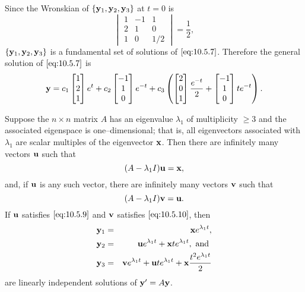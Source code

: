 \documentclass{ximera}
\begin{document}
\begin{example}
\begin{explanation}
Since the Wronskian of $\{{\bf y}_1,{\bf y}_2,{\bf y}_3\}$
at $t=0$ is
$$
\begin{vmatrix}
1&-1&1\\2&1&0\\1&0&1/2\end{vmatrix}=\frac{1}{2},
$$
$\{{\bf y}_1,{\bf y}_2,{\bf y}_3\}$ is a fundamental set of solutions
of $\eqref{eq:10.5.7}$. Therefore the general solution of $\eqref{eq:10.5.7}$
is
$$
{\bf y}=c_1\begin{bmatrix}1\\2\\1\end{bmatrix}e^t+c_2\begin{bmatrix}-1\\1\\0\end{bmatrix}e^{-t}+c_3\left
(\begin{bmatrix}2\\0\\1\end{bmatrix}\frac{e^{-t}}{2}+\begin{bmatrix}-1\\1\\0\end{bmatrix}te^{-t}\right).
$$
\end{explanation}
\end{example}


\begin{theorem}\label{thmtype:10.5.2}
Suppose the $n\times n$ matrix $A$ has an eigenvalue $\lambda_1$ of
multiplicity $\geq 3$ and the associated eigenspace is
one--dimensional; that is, all eigenvectors associated with
$\lambda_1$
are scalar multiples of the eigenvector ${\bf x}$. Then there are
infinitely many vectors ${\bf u}$ such that
\begin{equation}\label{eq:10.5.9}
(A-\lambda_1I){\bf u}={\bf x},
\end{equation}
and, if ${\bf u}$ is any such vector,  there are infinitely many
vectors ${\bf v}$ such that
\begin{equation}\label{eq:10.5.10}
(A-\lambda_1I){\bf v}={\bf u}.
\end{equation}
 If ${\bf u}$ satisfies $\eqref{eq:10.5.9}$  and ${\bf v}$ satisfies
$\eqref{eq:10.5.10}$,  then
\begin{eqnarray*}
{\bf y}_1 &=&{\bf x} e^{\lambda_1t},\\
{\bf y}_2&=&{\bf u}e^{\lambda_1t}+{\bf x} te^{\lambda_1t},\mbox{
and }\\
{\bf y}_3&=&{\bf v}e^{\lambda_1t}+{\bf u}te^{\lambda_1t}+{\bf
x} \frac{t^2e^{\lambda_1t}}{2}
\end{eqnarray*}
are linearly independent solutions of  ${\bf y}'=A{\bf y}$.
\end{theorem}
\end{document}
